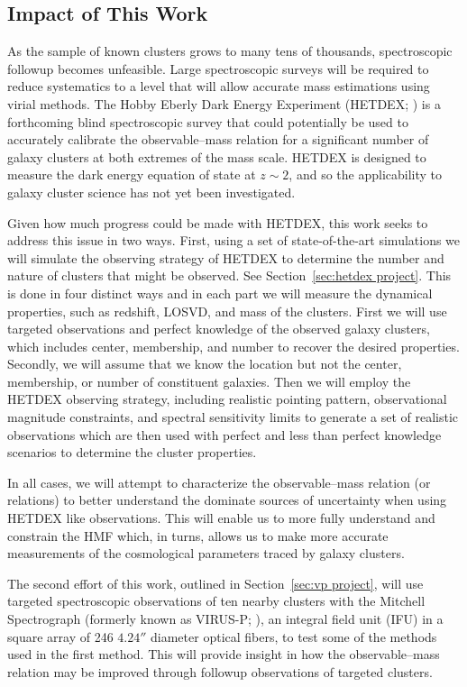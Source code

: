 \subsection{Impact of This Work}
As the sample of known clusters grows to many tens of thousands, spectroscopic followup becomes unfeasible. Large spectroscopic surveys will be required to reduce systematics to a level that will allow accurate mass estimations using virial methods. The Hobby Eberly Dark Energy Experiment (HETDEX; \citealt{Hill2008}) is a forthcoming blind spectroscopic survey that could potentially be used to accurately calibrate the observable--mass relation for a significant number of galaxy clusters at both extremes of the mass scale. HETDEX is designed to measure the dark energy equation of state at $z\sim2$, and so the applicability to galaxy cluster science has not yet been investigated.

Given how much progress could be made with HETDEX, this work seeks to address this issue in two ways. First, using a set of state-of-the-art simulations we will simulate the observing strategy of HETDEX to determine the number and nature of clusters that might be observed. See Section~\ref{sec:hetdex project}. This is done in four distinct ways and in each part we will measure the dynamical properties, such as redshift, LOSVD, and mass of the clusters. First we will use targeted observations and perfect knowledge of the observed galaxy clusters, which includes center, membership, and number to recover the desired properties. Secondly, we will assume that we know the location but not the center, membership, or number of constituent galaxies. Then we will employ the HETDEX observing strategy, including realistic pointing pattern, observational magnitude constraints, and spectral sensitivity limits to generate a set of realistic observations which are then used with perfect and less than perfect knowledge scenarios to determine the cluster properties. 

In all cases, we will attempt to characterize the observable--mass relation (or relations) to better understand the dominate sources of uncertainty when using HETDEX like observations. This will enable us to more fully understand and constrain the HMF which, in turns, allows us to make more accurate measurements of the cosmological parameters traced by galaxy clusters.

The second effort of this work, outlined in Section~\ref{sec:vp project}, will use targeted spectroscopic observations of ten nearby clusters with the Mitchell Spectrograph (formerly known as VIRUS-P; \citealt{Hill2008a}), an integral field unit (IFU) in a square array of 246 $4.24''$ diameter optical fibers, to test some of the methods used in the first method. This will provide insight in how the observable--mass relation may be improved through followup observations of targeted clusters.
